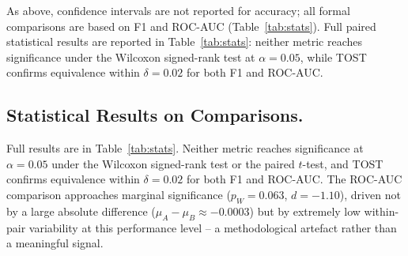 \documentclass[11pt,a4paper,twoside]{article}
\begin{document}
As above, confidence intervals are not reported for accuracy; all formal
comparisons are based on F1 and ROC-AUC (Table~\ref{tab:stats}).
Full paired statistical results are reported in Table~\ref{tab:stats}: neither metric reaches significance under the Wilcoxon signed-rank test at $\alpha = 0.05$, while TOST confirms equivalence within $\delta = 0.02$ for both F1 and ROC-AUC.

\subsection{Statistical Results on Comparisons.}

\begin{table}[ht]
	\centering
	\caption{Paired statistical comparison between the pretrained-then-fine-tuned model (A)
		and the from-scratch model (B) across genomes and metrics.
		$W$ and $p_W$ denote the Wilcoxon signed-rank statistic and its two-sided $p$-value;
		$d$ is Cohen's $d$; $p_{\mathrm{TOST}}$ is the equivalence test $p$-value at $\delta=0.02$.
		90\% CIs are used for TOST; 95\% CIs are reported for the mean difference.}
	\label{tab:stats}
\end{table}

Full results are in Table~\ref{tab:stats}. Neither metric reaches significance at $\alpha=0.05$ under the Wilcoxon signed-rank test or the paired $t$-test, and TOST confirms equivalence within $\delta=0.02$ for both F1 and ROC-AUC. The ROC-AUC comparison approaches marginal significance ($p_W=0.063$, $d=-1.10$), driven not by a large absolute difference ($\mu_A-\mu_B\approx-0.0003$) but by extremely low within-pair variability at this performance level -- a methodological artefact rather than a meaningful signal.
\end{document}
